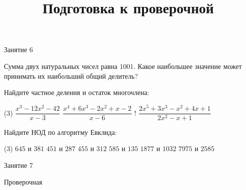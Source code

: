 \begin{class}[number=6]
	\begin{listofex}
		\item Занятие 6
	\end{listofex}
\end{class}

\begin{homework}[number=3]
	\begin{listofex}
		\item Сумма двух натуральных чисел равна \( 1001 \). Какое наибольшее значение может принимать их наибольший общий делитель?
		\item Найдите частное деления и остаток многочлена:
		\begin{tasks}(3)
			\task \( \dfrac{x^3-12x^2-42}{x-3} \)
			\task \( \dfrac{x^4+6x^3-2x^2+x-2}{x-6} \)
			\task! \( \dfrac{2x^5+3x^3-x^2+4x+1}{2x^2-x+1} \)
		\end{tasks}
		\item Найдите НОД по алгоритму Евклида:
		\begin{tasks}(3)
			\task \( 645 \) и \( 381 \)
			\task \( 451 \) и \( 287 \)
			\task \( 455 \) и \( 312 \)
			\task \( 585 \) и \( 135 \)
			\task \( 1877 \) и \( 1032 \)
			\task \( 7975 \) и \( 2585 \)
		\end{tasks}
	\end{listofex}
\end{homework}

\begin{class}[number=7]
	\title{Подготовка к проверочной}
	\begin{listofex}
		\item Занятие 7
	\end{listofex}
\end{class}

\begin{exam}
	\begin{listofex}
		\item Проверочная
	\end{listofex}
\end{exam}
